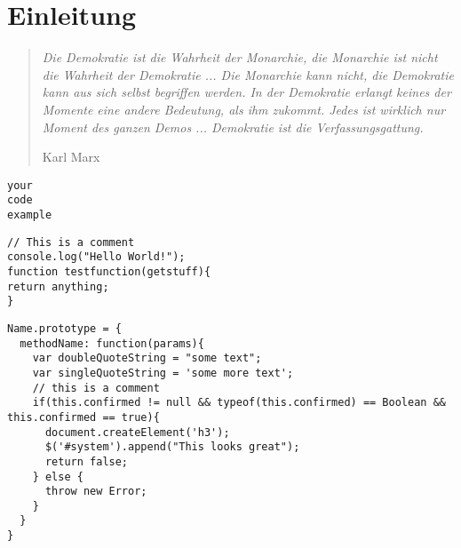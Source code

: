 \section{Einleitung}
\thispagestyle{plain}
\begin{quote}
\begin{small}
\textit{\glqq Die Demokratie ist die Wahrheit der Monarchie, die Monarchie ist nicht die Wahrheit der Demokratie ... Die Monarchie kann nicht, die Demokratie kann aus sich selbst begriffen werden. In der Demokratie erlangt keines der Momente eine andere Bedeutung, als ihm zukommt. Jedes ist wirklich nur Moment des ganzen Demos ... Demokratie ist die Verfassungsgattung.\grqq}\\
\end{small}
\vspace{5mm}
\begin{small}
\hspace{50mm} Karl Marx
\end{small}
\end{quote}
\begin{verbatim}
your
code
example
\end{verbatim}
\begin{lstlisting}
// This is a comment 
console.log("Hello World!");
function testfunction(getstuff){
return anything;
}
\end{lstlisting}
\medskip
\begin{lstlisting}[caption=My Javascript Example]
Name.prototype = {
  methodName: function(params){
    var doubleQuoteString = "some text";
    var singleQuoteString = 'some more text';
    // this is a comment
    if(this.confirmed != null && typeof(this.confirmed) == Boolean && this.confirmed == true){
      document.createElement('h3');
      $('#system').append("This looks great");
      return false;
    } else {
      throw new Error;
    }
  }
}
\end{lstlisting}